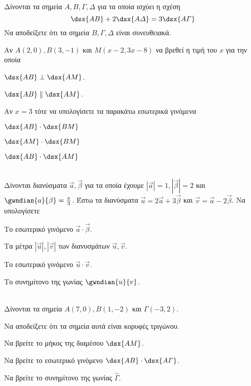 \documentclass[twoside,nofonts,ektypwsh,math,spyros]{frontisthrio-diag}
\begin{document}
\begin{thema}
\begin{erwthma}
\item Δίνονται τα σημεία $ A,B,\varGamma,\varDelta $ για τα οποία ισχύει η σχέση
\[ \dsx{AB}+2\dsx{A\varDelta}=3\dsx{A\varGamma} \]
Να αποδείξετε ότι τα σημεία $ B,\varGamma,\varDelta $ είναι συνευθειακά. 
\item Αν $ A(2,0), B(3,-1) $ και $ M(x-2,3x-8) $ να βρεθεί η τιμή του $ x $ για την οποία 
\begin{rlist}
\item $ \dsx{AB}\perp\dsx{AM} $. 
\item $ \dsx{AB}\parallel\dsx{AM} $. 
\end{rlist}
\item Αν $ x=3 $ τότε να υπολογίσετε τα παρακάτω εσωτερικά γινόμενα
\begin{multicols}{2}
\begin{rlist}
\item $ \dsx{AB}\cdot\dsx{BM} $
\item $ \dsx{AM}\cdot\dsx{BM} $
\item $ \dsx{AB}\cdot\dsx{AM} $
\end{rlist}
\end{multicols}
\end{erwthma}
\item \mbox{}\\
Δίνονται διανύσματα $ \vec{a},\vec{\beta} $ για τα οποία έχουμε $ |\vec{a}|=1,|\vec{\beta}|=2 $ και $ \gwndian{a}{\beta}=\frac{\pi}{3} $. Έστω τα διανύσματα $ \vec{u}=2\vec{a}+3\vec{\beta} $ και $ \vec{v}=\vec{a}-2\vec{\beta} $. Να υπολογίσετε
\begin{erwthma}
\item Το εσωτερικό γινόμενο $ \vec{a}\cdot\vec{\beta} $.
\item Τα μέτρα $ |\vec{u}|,|\vec{v}| $ των διανυσμάτων $ \vec{u},\vec{v} $.
\item Το εσωτερικό γινόμενο $ \vec{u}\cdot\vec{v} $.
\item Το συνημίτονο της γωνίας $ \gwndian{u}{v} $.
\end{erwthma}
\item \mbox{}\\
Δίνονται τα σημεία $ A(7,0),B(1,-2) $ και $ \varGamma(-3,2) $.
\begin{erwthma}
\item Να αποδείξετε ότι τα σημεία αυτά είναι κορυφές τριγώνου.
\item Να βρείτε το μήκος της διαμέσου $ \dsx{AM} $.
\item Να βρείτε το εσωτερικό γινόμενο $ \dsx{AB}\cdot\dsx{A\varGamma} $.
\item Να βρείτε το συνημίτονο της γωνίας $ \hat{\varGamma} $.
\end{erwthma}
\end{thema}
\kaliepityxia
\end{document}
